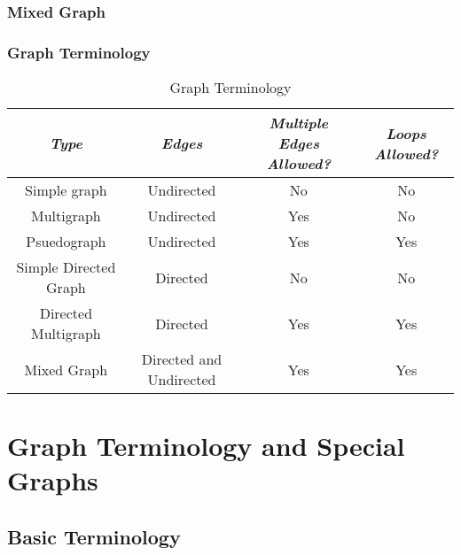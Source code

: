 \documentclass[12pt letter]{report}
\begin{document}
\subsection{Mixed Graph}

\subsection{Graph Terminology}

\begin{table}[htpb]
  \centering
  \begin{tabular}{|c|c|c|c|}
    \hline
    \textit{Type}         & \textit{Edges}          & \textit{Multiple Edges Allowed?} & \textit{Loops Allowed?} \\ [0.5ex]
    \hline
    \hline
    Simple graph          & Undirected              & No                               & No                      \\
    Multigraph            & Undirected              & Yes                              & No                      \\
    Psuedograph           & Undirected              & Yes                              & Yes                     \\
    Simple Directed Graph & Directed                & No                               & No                      \\
    Directed Multigraph   & Directed                & Yes                              & Yes                     \\
    Mixed Graph           & Directed and Undirected & Yes                              & Yes                     \\
    \hline
  \end{tabular}
  \caption{Graph Terminology}
  \label{tab:grp1}
\end{table}

\chapter{Graph Terminology and Special Graphs}

\section{Basic Terminology}

\end{document}

